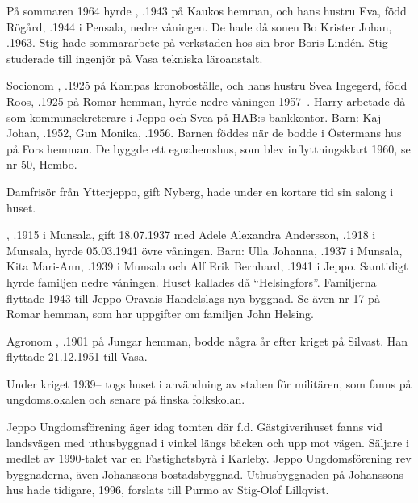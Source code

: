 På sommaren 1964 hyrde , .1943 på Kaukos hemman, och hans hustru Eva, född Rögård, .1944 i Pensala, nedre våningen. De hade då sonen Bo Krister Johan, .1963. Stig hade sommararbete på verkstaden hos sin bror Boris Lindén. Stig studerade till ingenjör på Vasa tekniska läroanstalt.

Socionom , .1925 på Kampas kronoboställe, och hans hustru Svea Ingegerd, född Roos, .1925 på Romar hemman, hyrde nedre våningen 1957--. Harry arbetade då som kommunsekreterare i Jeppo och Svea på HAB:s bankkontor.	Barn:	Kaj Johan, .1952, 	Gun Monika,	.1956.	Barnen föddes när de bodde i Östermans hus på Fors hemman. De byggde ett egnahemshus, som blev inflyttningsklart 1960, se nr 50, Hembo.

Damfrisör  från Ytterjeppo, gift Nyberg, hade under en kortare tid sin salong i huset.

, .1915 i Munsala, gift 18.07.1937 med Adele Alexandra Andersson, .1918 i Munsala, hyrde 05.03.1941  övre våningen. Barn: Ulla Johanna,	.1937 i Munsala, Kita Mari-Ann, .1939 i Munsala och 	Alf Erik Bernhard, .1941 i Jeppo. Samtidigt hyrde familjen  nedre våningen. Huset kallades då ``Helsingfors''. Familjerna flyttade 1943 till Jeppo-Oravais Handelslags nya byggnad. Se även nr 17 på Romar hemman, som har uppgifter om familjen John Helsing.

Agronom , .1901 på Jungar hemman, bodde några år efter kriget på Silvast. Han flyttade 21.12.1951 till Vasa.

Under kriget 1939-- togs huset i användning av staben för militären, som fanns på ungdomslokalen och senare på finska folkskolan.



Jeppo Ungdomsförening äger idag tomten där f.d. Gästgiverihuset	fanns vid landsvägen med uthusbyggnad i vinkel längs bäcken och upp 	mot vägen. Säljare i medlet av 1990-talet var en Fastighetsbyrå i Karleby. Jeppo Ungdomsförening rev byggnaderna, även Johanssons bostadsbyggnad. Uthusbyggnaden på Johanssons hus hade tidigare, 1996, forslats till Purmo av Stig-Olof Lillqvist.


